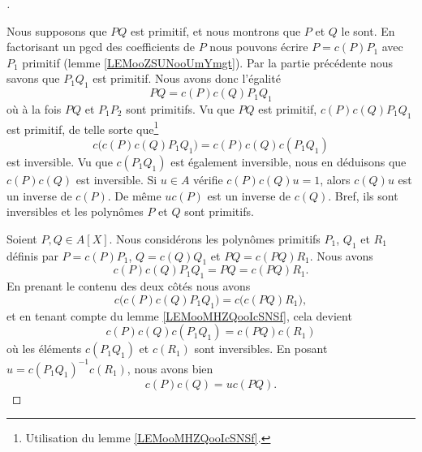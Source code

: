\begin{proof}[\cite{BIBooXBJQooOCerti}]
\begin{subproof}
		Nous supposons que \( PQ\) est primitif, et nous montrons que \( P\) et \( Q\) le sont. En factorisant un pgcd des coefficients de \( P\) nous pouvons écrire \( P=c(P)P_1\) avec \( P_1\) primitif (lemme \ref{LEMooZSUNooUmYmgt}). Par la partie précédente nous savons que \( P_1Q_1\) est primitif. Nous avons donc l'égalité
		\begin{equation}
			PQ=c(P)c(Q)P_1Q_1
		\end{equation}
		où à la fois \( PQ\) et \( P_1P_2\) sont primitifs. Vu que \( PQ\) est primitif, \( c(P)c(Q)P_1Q_1\) est primitif, de telle sorte que\footnote{Utilisation du lemme \ref{LEMooMHZQooIcSNSf}.}
		\begin{equation}
			c\Big( c(P)c(Q)P_1Q_1 \Big)=c(P)c(Q)c(P_1Q_1)
		\end{equation}
		est inversible. Vu que \( c(P_1Q_1)\) est également inversible, nous en déduisons que \( c(P)c(Q)\) est inversible. Si \( u\in A\) vérifie \( c(P)c(Q)u=1\), alors \( c(Q)u\) est un inverse de \( c(P)\). De même \( uc(P)\) est un inverse de \( c(Q)\). Bref, ils sont inversibles et les polynômes \( P\) et \( Q\) sont primitifs.

	\end{subproof}

	Soient \( P,Q\in A[X]\). Nous considérons les polynômes primitifs \( P_1\), \( Q_1\) et \( R_1\) définis par \( P=c(P)P_1\), \( Q=c(Q)Q_1\) et \( PQ=c(PQ)R_1\). Nous avons
	\begin{equation}
		c(P)c(Q)P_1Q_1=PQ=c(PQ)R_1.
	\end{equation}
	En prenant le contenu des deux côtés nous avons
	\begin{equation}
		c\Big( c(P)c(Q)P_1Q_1 \Big)=c\Big( c(PQ)R_1 \Big),
	\end{equation}
	et en tenant compte du lemme \ref{LEMooMHZQooIcSNSf}, cela devient
	\begin{equation}
		c(P)c(Q)c(P_1Q_1)=c(PQ)c(R_1)
	\end{equation}
	où les éléments \( c(P_1Q_1)\) et \( c(R_1)\) sont inversibles. En posant \( u=c(P_1Q_1)^{-1}c(R_1)\), nous avons bien
	\begin{equation}
		c(P)c(Q)=uc(PQ).
	\end{equation}
\end{proof}

